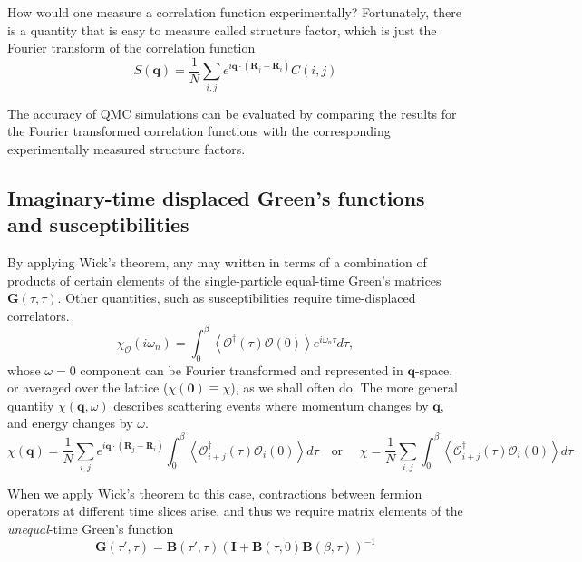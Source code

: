 How would one measure a correlation function experimentally? Fortunately, there is a quantity that is easy to measure called structure factor, which is just the Fourier transform of the correlation function
\begin{equation}\label{eq:S(q)}
S(\bm q) = \frac{1}{N} \sum_{i, j} e^{i\bm q \cdot (\bm R_j - \bm R_i) } C(i, j) 
\end{equation}

The accuracy of QMC simulations can be evaluated by comparing the results for the Fourier transformed correlation functions with the corresponding experimentally measured structure factors.

\subsection{Imaginary-time displaced Green's functions and susceptibilities}
\label{subsec:imtimedisp}

By applying Wick's theorem, any  may written in terms of a combination of products of certain elements of the single-particle equal-time Green's matrices $\bm G ( \tau, \tau )$.
Other  quantities, such as susceptibilities require time-displaced correlators.
\begin{equation}
\chi_{\mathcal{O}} ( i \omega_n ) = \int_0^\beta \left\langle \mathcal{O}^\dagger ( \tau ) \mathcal{O} ( 0 ) \right\rangle e^{i\omega_n \tau} d\tau ,
\end{equation}
whose $\omega =0$ component can be Fourier transformed and represented in $\bm q$-space, or averaged over the lattice ($\chi ( \bm 0 ) \equiv \chi$), as we shall often do.
The more general quantity $\chi (\bm q, \omega)$ describes scattering events where momentum changes by $\bm q$, and energy changes by $ \omega$.
\begin{equation}\label{eq:chi(q)}
\chi ( \bm q ) = \frac{1}{N} \sum_{i, j} e^{i\bm q \cdot ( \bm R_j - \bm R_i )} \int_0^\beta \left\langle \mathcal{O}_{i + j}^\dagger ( \tau ) \mathcal{O}_i ( 0 ) \right\rangle d\tau \quad \text{or } \quad \chi = \frac{1}{N} \sum_{i, j} \int_0^\beta \left\langle \mathcal{O}_{i + j}^\dagger ( \tau ) \mathcal{O}_i ( 0 ) \right\rangle d\tau
\end{equation}

When we apply Wick's theorem to this case, contractions between fermion operators at different time slices arise, and thus we require matrix elements of the \emph{unequal}-time Green's function
\begin{equation}
\bm G ( \tau' , \tau ) = \bm B ( \tau', \tau ) ( \bm I + \bm B ( \tau, 0 ) \bm B ( \beta, \tau ) )^{-1}
\end{equation}

